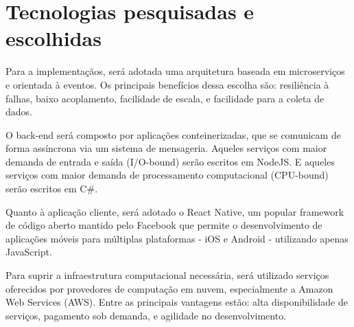 \chapter{Tecnologias pesquisadas e escolhidas}
\label{c.tecnologias}


Para a implementaçãos, será adotada uma arquitetura baseada em microserviços e orientada à eventos. Os principais benefícios dessa escolha são: resiliência à falhas, baixo acoplamento, facilidade de escala, e facilidade para a coleta de dados.

O back-end será composto por aplicações conteinerizadas, que se comunicam de forma assíncrona via um sistema de mensageria. Aqueles serviços com maior demanda de entrada e saída (I/O-bound) serão escritos em NodeJS. E aqueles serviços com maior demanda de processamento computacional (CPU-bound) serão escritos em C\#.

Quanto à aplicação cliente, será adotado o React Native, um popular framework de código aberto mantido pelo Facebook que permite o desenvolvimento de aplicações móveis para múltiplas plataformas - iOS e Android - utilizando apenas JavaScript. 

Para suprir a infraestrutura computacional necessária, será utilizado serviços oferecidos por provedores de computação em nuvem, especialmente a Amazon Web Services (AWS). Entre as principais vantagens estão: alta disponibilidade de serviços, pagamento sob demanda, e agilidade no desenvolvimento.